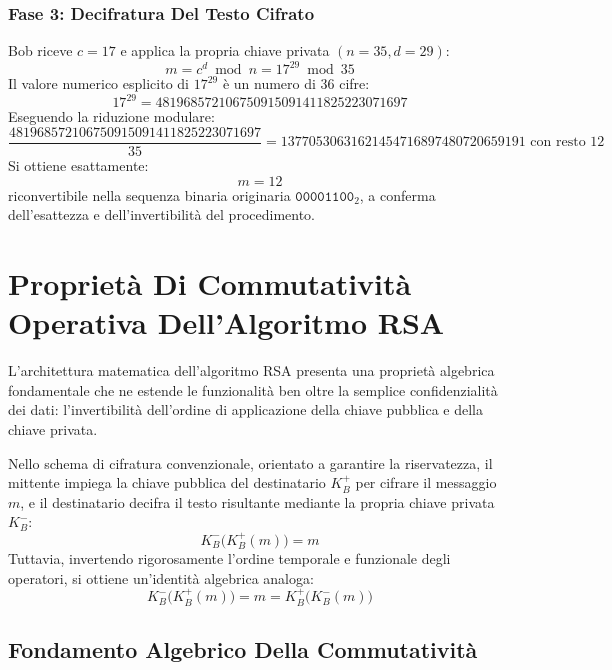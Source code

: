 \documentclass[11pt, a4paper]{article}
\begin{document}
\subsubsection{Fase 3: Decifratura Del Testo Cifrato}
Bob riceve $c = 17$ e applica la propria chiave privata $(n=35, d=29)$:
\[
m = c^d \bmod n = 17^{29} \bmod 35
\]
Il valore numerico esplicito di $17^{29}$ è un numero di 36 cifre:
\[
17^{29} = 481968572106750915091411825223071697
\]
Eseguendo la riduzione modulare:
\[
\frac{481968572106750915091411825223071697}{35} = 13770530631621454716897480720659191 \text{ con resto } 12
\]
Si ottiene esattamente:
\[
\boxed{m = 12}
\]
riconvertibile nella sequenza binaria originaria $\texttt{00001100}_2$, a conferma dell'esattezza e dell'invertibilità del procedimento.

\section{Proprietà Di Commutatività Operativa Dell'Algoritmo RSA}

L'architettura matematica dell'algoritmo RSA presenta una proprietà algebrica fondamentale che ne estende le funzionalità ben oltre la semplice confidenzialità dei dati: l'invertibilità dell'ordine di applicazione della chiave pubblica e della chiave privata.

Nello schema di cifratura convenzionale, orientato a garantire la riservatezza, il mittente impiega la chiave pubblica del destinatario $K_B^+$ per cifrare il messaggio $m$, e il destinatario decifra il testo risultante mediante la propria chiave privata $K_B^-$:
\[
K_B^-\bigl(K_B^+(m)\bigr) = m
\]
Tuttavia, invertendo rigorosamente l'ordine temporale e funzionale degli operatori, si ottiene un'identità algebrica analoga:
\begin{equation}
\boxed{K_B^-\bigl(K_B^+(m)\bigr) = m = K_B^+\bigl(K_B^-(m)\bigr)}
\end{equation}


\subsection{Fondamento Algebrico Della Commutatività}
\end{document}
